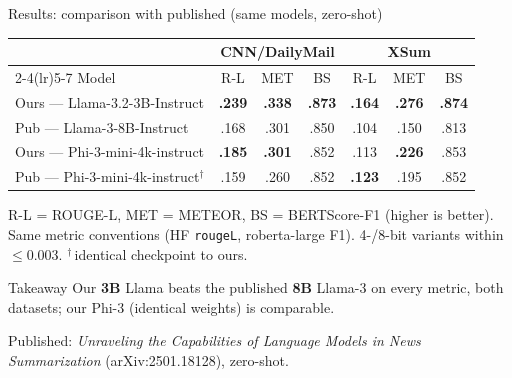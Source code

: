 \begin{frame}{Results: comparison with published (same models, zero-shot)}

  \begin{table}
    \footnotesize
    \begin{tabular}{@{}l cccccc@{}}
      \toprule
       & \multicolumn{3}{c}{CNN/DailyMail} & \multicolumn{3}{c}{XSum} \\
      \cmidrule(lr){2-4}\cmidrule(lr){5-7}
      Model & R-L & MET & BS & R-L & MET & BS \\
      \midrule
      \alert{Ours --- Llama-3.2-3B-Instruct} & \textbf{.239} & \textbf{.338} & \textbf{.873} & \textbf{.164} & \textbf{.276} & \textbf{.874} \\
      Pub --- Llama-3-8B-Instruct           & .168 & .301 & .850 & .104 & .150 & .813 \\
      \addlinespace
      \alert{Ours --- Phi-3-mini-4k-instruct} & \textbf{.185} & \textbf{.301} & .852 & .113 & \textbf{.226} & .853 \\
      Pub --- Phi-3-mini-4k-instruct$^{\dagger}$ & .159 & .260 & .852 & \textbf{.123} & .195 & .852 \\
      \bottomrule
    \end{tabular}
  \end{table}

  \footnotesize
  R-L = ROUGE-L, MET = METEOR, BS = BERTScore-F1 (higher is better). Same metric
  conventions (HF \texttt{rougeL}, roberta-large F1). 4-/8-bit variants within
  $\le 0.003$. $^{\dagger}$\,identical checkpoint to ours.

  \begin{exampleblock}{Takeaway}
    Our \textbf{3B} Llama beats the published \textbf{8B} Llama-3 on every metric,
    both datasets; our Phi-3 (identical weights) is comparable.
  \end{exampleblock}

  {\tiny Published: \emph{Unraveling the Capabilities of Language Models in News Summarization} (arXiv:2501.18128), zero-shot.}

\end{frame}
